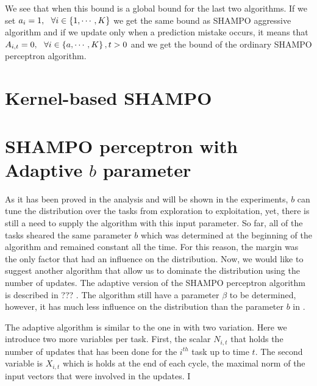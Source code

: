 {We see that when this  bound is a global bound for the last two algorithms. 
If we set $a_i=1, ~~\forall i\in\left\{{1,\cdots,K}\right\}$ we get the same bound as  SHAMPO aggressive 
algorithm and if we update only when a prediction mistake occurs, it means that 
$A_{i,t}=0,~~\forall i\in\left\{{a,\cdots,K}\right\},t>0$ and we get the bound of  the ordinary 
SHAMPO perceptron algorithm.

\section{Kernel-based SHAMPO}



\section{SHAMPO perceptron with Adaptive $b$ parameter}

As it has been proved in the analysis and will be shown in the experiments, $b$ can tune the distribution over the tasks from exploration to exploitation, yet, there is still a need to supply the algorithm with this input parameter. So far, all of the tasks sheared the same parameter $b$ which was determined at the beginning of the algorithm and remained constant all the time. For this reason, the margin was the only factor that had an influence on the distribution. Now, we would like to suggest another algorithm that allow us to  dominate the distribution using the number of updates. The adaptive version of the  SHAMPO perceptron algorithm is  described in  ??? . The algorithm still have a parameter $\beta$ to be determined, however, it has much less influence on the distribution than the parameter $b$ in  .

The adaptive algorithm is similar to the one in  with two variation. Here we introduce two more variables per task. First, the scalar $N_{i,t}$ that holds the number of updates that has been done for the $i^{th}$ task  up to time $t$. The second variable is $X_{i,t}$ which is holds at the end of each cycle,  the maximal norm of the input vectors that were involved in the updates. I

}
